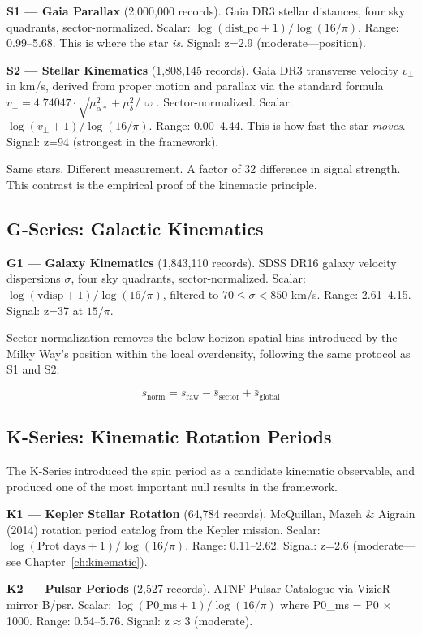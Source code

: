 \documentclass[11pt, letterpaper, openany]{book}
\begin{document}
\textbf{S1 --- Gaia Parallax} (2,000,000 records). Gaia DR3 stellar distances, four sky
quadrants, sector-normalized. Scalar: $\log(\text{dist\_pc} + 1)/\log(16/\pi)$. Range:
0.99--5.68. This is where the star \emph{is}. Signal: z=2.9 (moderate---position).

\textbf{S2 --- Stellar Kinematics} (1,808,145 records). Gaia DR3 transverse velocity
$v_\perp$ in km/s, derived from proper motion and parallax via the standard formula
$v_\perp = 4.74047 \cdot \sqrt{\mu_{\alpha*}^2 + \mu_\delta^2} / \varpi$.
Sector-normalized. Scalar: $\log(v_\perp + 1)/\log(16/\pi)$. Range: 0.00--4.44. This is how
fast the star \emph{moves}. Signal: z=94 (strongest in the framework).

Same stars. Different measurement. A factor of 32 difference in signal strength. This contrast
is the empirical proof of the kinematic principle.

\subsection*{G-Series: Galactic Kinematics}

\textbf{G1 --- Galaxy Kinematics} (1,843,110 records). SDSS DR16 galaxy velocity dispersions
$\sigma$, four sky quadrants, sector-normalized. Scalar:
$\log(\text{vdisp} + 1)/\log(16/\pi)$, filtered to $70 \leq \sigma < 850$ km/s.
Range: 2.61--4.15. Signal: z=37 at $15/\pi$.

Sector normalization removes the below-horizon spatial bias introduced by the Milky Way's
position within the local overdensity, following the same protocol as S1 and S2:

\[
s_{\text{norm}} = s_{\text{raw}} - \bar{s}_{\text{sector}} + \bar{s}_{\text{global}}
\]

\subsection*{K-Series: Kinematic Rotation Periods}

The K-Series introduced the spin period as a candidate kinematic observable, and produced one
of the most important null results in the framework.

\textbf{K1 --- Kepler Stellar Rotation} (64,784 records). McQuillan, Mazeh \& Aigrain (2014)
rotation period catalog from the Kepler mission. Scalar: $\log(\text{Prot\_days} + 1) /
\log(16/\pi)$. Range: 0.11--2.62. Signal: z=2.6 (moderate---see Chapter~\ref{ch:kinematic}).

\textbf{K2 --- Pulsar Periods} (2,527 records). ATNF Pulsar Catalogue via VizieR mirror B/psr.
Scalar: $\log(\text{P0\_ms} + 1)/\log(16/\pi)$ where P0\_ms = P0 $\times$ 1000. Range:
0.54--5.76. Signal: z$\approx$3 (moderate).
\end{document}
